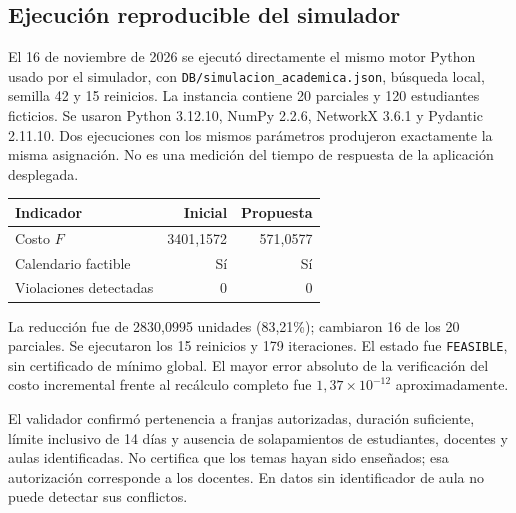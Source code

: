 \documentclass[12pt,letterpaper]{article}
\begin{document}
\subsection{Ejecución reproducible del simulador}
El 16 de noviembre de 2026 se ejecutó directamente el mismo motor Python usado por el simulador, con \texttt{DB/simulacion\_academica.json}, búsqueda local, semilla 42 y 15 reinicios. La instancia contiene 20 parciales y 120 estudiantes ficticios. Se usaron Python 3.12.10, NumPy 2.2.6, NetworkX 3.6.1 y Pydantic 2.11.10. Dos ejecuciones con los mismos parámetros produjeron exactamente la misma asignación. No es una medición del tiempo de respuesta de la aplicación desplegada.

\begin{center}
\begin{tabular}{lrr}
\toprule
Indicador & Inicial & Propuesta\\
\midrule
Costo $F$ & 3401,1572 & 571,0577\\
Calendario factible & Sí & Sí\\
Violaciones detectadas & 0 & 0\\
\bottomrule
\end{tabular}
\end{center}
La reducción fue de 2830,0995 unidades (83,21\%); cambiaron 16 de los 20 parciales. Se ejecutaron los 15 reinicios y 179 iteraciones. El estado fue \texttt{FEASIBLE}, sin certificado de mínimo global. El mayor error absoluto de la verificación del costo incremental frente al recálculo completo fue $1,37\times10^{-12}$ aproximadamente.

El validador confirmó pertenencia a franjas autorizadas, duración suficiente, límite inclusivo de 14 días y ausencia de solapamientos de estudiantes, docentes y aulas identificadas. No certifica que los temas hayan sido enseñados; esa autorización corresponde a los docentes. En datos sin identificador de aula no puede detectar sus conflictos.
\end{document}
